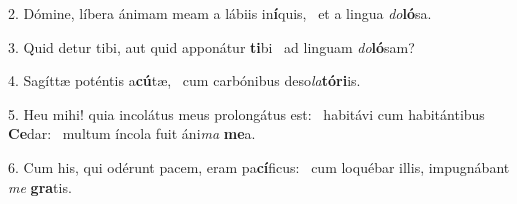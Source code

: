 2. Dómine, líbera ánimam meam a lábiis in\textbf{í}quis, \ast\  et a lingua \textit{do}\textbf{ló}sa.\

3. Quid detur tibi, aut quid apponátur \textbf{ti}bi \ast\  ad linguam \textit{do}\textbf{ló}sam?\

4. Sagíttæ poténtis a\textbf{cú}tæ, \ast\  cum carbónibus deso\textit{la}\textbf{tó}\textbf{ri}is.\

5. Heu mihi! quia incolátus meus prolongátus est: \dag\  habitávi cum habitántibus \textbf{Ce}dar: \ast\  multum íncola fuit áni\textit{ma} \textbf{me}a.\

6. Cum his, qui odérunt pacem, eram pa\textbf{cí}ficus: \ast\  cum loquébar illis, impugnábant \textit{me} \textbf{gra}tis.\

